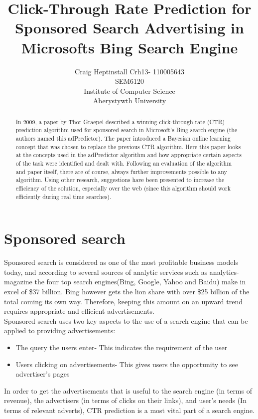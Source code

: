 \documentclass[journal]{IEEEtran}
\begin{document}
\title{Click-Through Rate Prediction for Sponsored Search Advertising in Microsofts Bing Search Engine}
\author{Craig Heptinstall Crh13- 110005643 \\
SEM6120\\Institute of Computer Science\\Aberystywth University}

\maketitle


\begin{abstract}
In 2009, a paper by Thor Graepel \cite{bing-paper} described a winning click-through rate (CTR) prediction algorithm used for sponsored search in Microsoft's Bing search engine (the authors named this adPredictor). The paper introduced a Bayesian online learning concept that was chosen to replace the previous CTR algorithm. Here this paper looks at the concepts used in the adPredictor algorithm and how appropriate certain aspects of the task were identified and dealt with. Following an evaluation of the algorithm and paper itself, there are of course, always further improvements possible to any algorithm. Using other research, suggestions have been presented to increase the efficiency of the solution, especially over the web (since this algorithm should work efficiently during real time searches).

\end{abstract}

\section{Sponsored search}
Sponsored search is considered as one of the most profitable business models today, and according to several sources of analytic services such as analytics-magazine \cite{business-model} the four top search engines(Bing, Google, Yahoo and Baidu) make in excel of \$37 billion. Bing however gets the lion share with over \$25 billion of the total coming its own way. Therefore, keeping this amount on an upward trend requires appropriate and efficient advertisements. \\
Sponsored search uses two key aspects to the use of a search engine that can be applied to providing advertisements:
\begin{itemize}
\item The query the users enter- This indicates the requirement of the user
\item Users clicking on advertisements- This gives users the opportunity to see advertiser's pages
\end{itemize}
In order to get the advertisements that is useful to the search engine (in terms of revenue), the advertisers (in terms of clicks on their links), and user's needs (In terms of relevant adverts), CTR prediction is a most vital part of a search engine.
\end{document}
